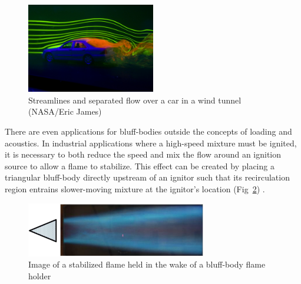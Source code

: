 \documentclass[journal]{new-aiaa}
\begin{document}
\begin{figure}[htb]
\begin{center}
\includegraphics[width=0.5\textwidth]{Images/logan/james_CarWakePIV.jpg}
\caption{ Streamlines and separated flow over a car in a wind tunnel (NASA/Eric James) }
\label{fig:carwake}
\end{center}
\end{figure}

There are even applications for bluff-bodies outside the concepts of loading and acoustics. In industrial applications where a high-speed mixture must be ignited, it is necessary to both reduce the speed and mix the flow around an ignition source to allow a flame to stabilize. This effect can be created by placing a triangular bluff-body directly upstream of an ignitor such that its recirculation region entrains slower-moving mixture at the ignitor's location (Fig~\ref{fig:flameholder}) \cite{li2011large}.

\begin{figure}[htb]
\begin{center}
\includegraphics[width=0.7\textwidth]{Images/logan/tanaka2013bluff_FlameHolder.pdf}
\caption{ Image of a stabilized flame held in the wake of a bluff-body flame holder \cite{tanaka2013bluff} }
\label{fig:flameholder}
\end{center}
\end{figure}
\end{document}
